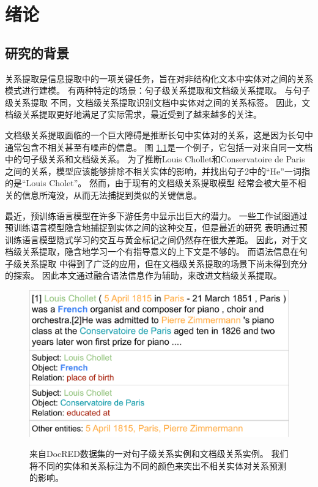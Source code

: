 \documentclass[bachelor]{thesis-uestc}
\begin{document}
\thesistableofcontents

\chapter{绪\hspace{6pt}论}
\section{研究的背景}
关系提取是信息提取中的一项关键任务，旨在对非结构化文本中实体对之间的关系模式进行建模。
有两种特定的场景：句子级关系提取和文档级关系提取。
与句子级关系提取 \cite{sentenceRE-Dixit, sentenceRE-Lyu} 不同，文档级关系提取识别文档中实体对之间的关系标签。
因此，文档级关系提取更好地满足了实际需求，最近受到了越来越多的关注。\par

文档级关系提取面临的一个巨大障碍是推断长句中实体对的关系，这是因为长句中通常包含不相关甚至有噪声的信息。
图 \ref{fig_exam}是一个例子，它包括一对来自同一文档中的句子级关系和文档级关系。
为了推断Louis Chollet和Conservatoire de Paris之间的关系，模型应该能够排除不相关实体的影响，并找出句子2中的“He”一词指的是“Louis Cholet”。
然而，由于现有的文档级关系提取模型 \cite{bai-etal-2021-syntax} 经常会被大量不相关的信息所淹没，从而无法捕捉到类似的关键信息。 \par

最近，预训练语言模型在许多下游任务中显示出巨大的潜力。
一些工作\cite{ye-etal-2020-co-ferential, zhou2021document}试图通过预训练语言模型隐含地捕捉到实体之间的这种交互，但是最近的研究 \cite{sundaraman2019syntax, bai-etal-2021-syntax, liu2023document} 表明通过预训练语言模型隐式学习的交互与黄金标记之间仍然存在很大差距。
因此，对于文档级关系提取，隐含地学习一个有指导意义的上下文是不够的。
而语法信息在句子级关系提取 \cite{xu-etal-2016-improved, qin-etal-2021-relation} 中得到了广泛的应用，但在文档级关系提取的场景下尚未得到充分的探索。
因此本文通过融合语法信息作为辅助，来改进文档级关系提取。\par

\begin{figure}
    \includegraphics[height=0.5\textwidth]{misc/example1.pdf}
    \label{fig_exam}
    \caption{
        来自DocRED数据集的一对句子级关系实例和文档级关系实例。
        我们将不同的实体和关系标注为不同的颜色来突出不相关实体对关系预测的影响。
    }
\end{figure}
\end{document}
